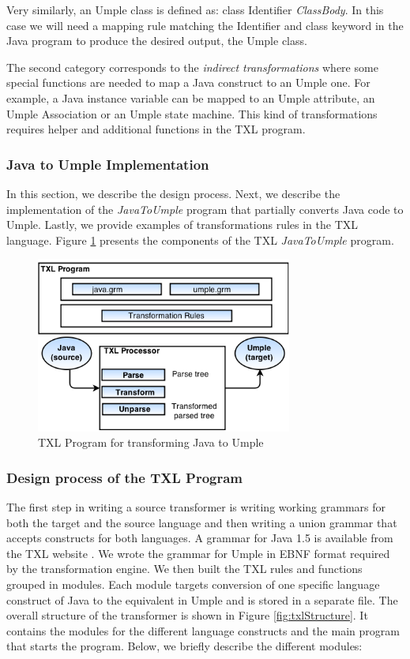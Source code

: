 Very similarly, an Umple class is defined as: class Identifier \textit{ClassBody}. In this case we will need a mapping rule matching the Identifier and class keyword in the Java program to produce the desired output, the Umple class. 

The second category corresponds to the \textit{indirect transformations} where some special functions are needed to map a Java construct to an Umple one. For example, a Java instance variable can be mapped to an Umple attribute, an Umple Association or an Umple state machine. This kind of transformations requires helper and additional functions in the TXL program. 

\subsubsection{Java to Umple Implementation}

In this section, we describe the design process. Next, we describe the implementation of the \textit{JavaToUmple} program that partially converts Java code to Umple. Lastly, we provide examples of transformations rules in the TXL language. Figure \ref{fig:txl} presents the components of the TXL \textit{JavaToUmple} program. 

\begin{figure}[h]
\centering
\includegraphics[width=0.75\textwidth]{Figures/TXLprogram.png} 
\caption{TXL Program for transforming Java to Umple}
\label{fig:txl}
\end{figure}

\subsubsection{Design process of the TXL Program}

The first step in writing a source transformer is writing working grammars for both the target and the source language and then writing a union grammar that accepts constructs for both languages. A grammar for Java 1.5 is available from the TXL website \cite{txlresources}. We wrote the grammar for Umple in EBNF format required by the transformation engine. We then built the TXL rules and functions grouped in modules. Each module targets conversion of one specific language construct of Java to the equivalent in Umple and is stored in a separate file. The overall structure of the transformer is shown in Figure \ref{fig:txlStructure}. It contains the modules for the different language constructs and the main program that starts the program. Below, we briefly describe the different modules:

